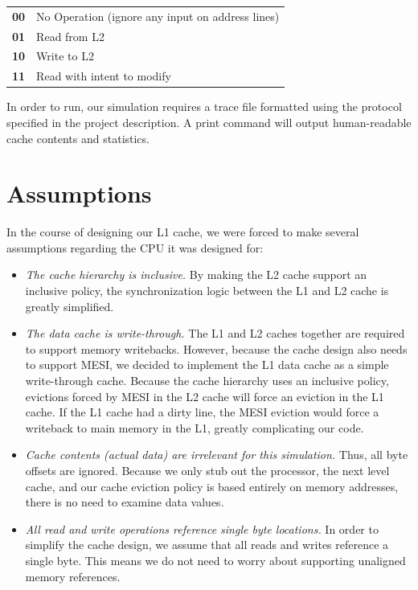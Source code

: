 \documentclass{article}
\begin{document}
\begin{center}
  \begin{tabular}{ll}
    \textbf{00} & No Operation (ignore any input on address lines) \\
    \textbf{01} &  Read from L2\\
    \textbf{10} & Write to L2 \\
    \textbf{11} & Read with intent to modify
  \end{tabular}
\end{center}

In order to run, our simulation requires a trace file formatted using
the protocol specified in the project description.  A print command
will output human-readable cache contents and statistics.

\section{Assumptions}

In the course of designing our L1 cache, we were forced to make
several assumptions regarding the CPU it was designed for:

\begin{itemize}

\item \emph{The cache hierarchy is inclusive.} By making the L2
  cache support an inclusive policy, the synchronization logic
  between the L1 and L2 cache is greatly simplified.

\item \emph{The data cache is write-through.} The L1 and L2 caches
  together are required to support memory writebacks. However, because
  the cache design also needs to support MESI, we decided to implement
  the L1 data cache as a simple write-through cache. Because the cache
  hierarchy uses an inclusive policy, evictions forced by MESI in the
  L2 cache will force an eviction in the L1 cache. If the L1 cache had
  a dirty line, the MESI eviction would force a writeback to main
  memory in the L1, greatly complicating our code.

\item \emph{Cache contents (actual data) are irrelevant for this
  simulation.} Thus, all byte offsets are ignored.  Because we only
  stub out the processor, the next level cache, and our cache eviction
  policy is based entirely on memory addresses, there is no need to
  examine data values.

\item \emph{All read and write operations reference single byte
  locations.} In order to simplify the cache design, we assume that
  all reads and writes reference a single byte. This means we do not
  need to worry about supporting unaligned memory references.

\end{itemize}
\end{document}
